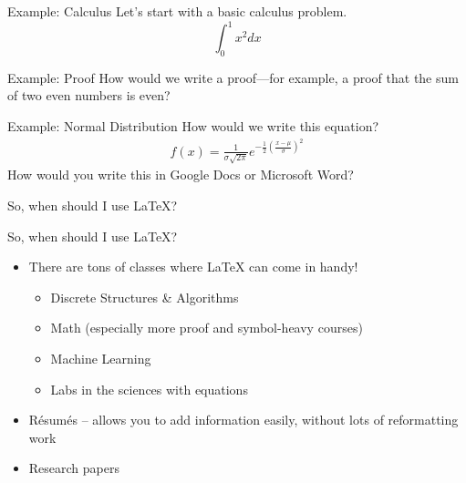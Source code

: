 \documentclass{beamer}
\begin{document}
\begin{frame}{Example: Calculus}
    Let's start with a basic calculus problem. 
    \begin{equation*}
    \int_{0}^{1} x^2 dx
    \end{equation*}
\end{frame}

\begin{frame}{Example: Proof}
    How would we write a proof---for example, a proof that the sum of two even numbers is even?
\end{frame}

\begin{frame}{Example: Normal Distribution}
    How would we write this equation?
    \begin{align*}
    f(x) = \frac{1}{\sigma \sqrt{2\pi} } e^{-\frac{1}{2}\left(\frac{x-\mu}{\sigma}\right)^2}
    \end{align*}
    How would you write this in Google Docs or Microsoft Word?
\end{frame}

\begin{frame}{So, when should I use \LaTeX?}
\end{frame}

\begin{frame}{So, when should I use \LaTeX?}
    \begin{itemize}
        \item There are tons of classes where \LaTeX{} can come in handy!
        \begin{itemize}
            \item Discrete Structures \& Algorithms
            \item Math (especially more proof and symbol-heavy courses)
            \item Machine Learning
            \item Labs in the sciences with equations
        \end{itemize}
        \item Résumés -- allows you to add information easily, without lots of reformatting work
        \item Research papers
    \end{itemize}
\end{frame}
\end{document}
